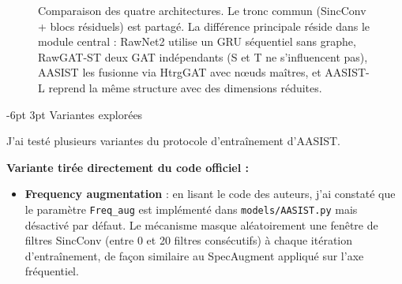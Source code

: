 \documentclass[10pt, a4paper]{article}
\makeatletter
\renewcommand{\subsection}{\@startsection{subsection}{2}{\z@}%
  {-6pt \@plus -2pt \@minus -1pt}{3pt \@plus 1pt}%
  {\normalfont\large\bfseries}}
\makeatother
\begin{document}
\begin{figure}[H]
{}
\caption{Comparaison des quatre architectures. Le tronc commun (SincConv + blocs résiduels) est partagé. La différence principale réside dans le module central : RawNet2 utilise un GRU séquentiel sans graphe, RawGAT-ST deux GAT indépendants (S et T ne s'influencent pas), AASIST les fusionne via HtrgGAT avec nœuds maîtres, et AASIST-L reprend la même structure avec des dimensions réduites.}
\label{fig:comparaison}
\end{figure}

\subsection{Variantes explorées}
\label{sec:variantes}

J'ai testé plusieurs variantes du protocole d'entraînement d'AASIST.

\textbf{Variante tirée directement du code officiel :}

\begin{itemize}
  \item \textbf{Frequency augmentation} : en lisant le code des auteurs, j'ai constaté que le paramètre \texttt{Freq\_aug} est implémenté dans \texttt{models/AASIST.py} mais désactivé par défaut. Le mécanisme masque aléatoirement une fenêtre de filtres SincConv (entre 0 et 20 filtres consécutifs) à chaque itération d'entraînement, de façon similaire au SpecAugment appliqué sur l'axe fréquentiel.
\end{itemize}
\end{document}
